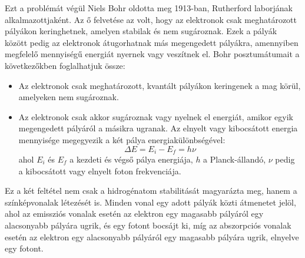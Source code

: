 \documentclass[../main.tex]{subfiles}
\begin{document}
Ezt a problémát végül Niels Bohr oldotta meg 1913-ban, Rutherford laborjának alkalmazottjaként. Az ő felvetése az volt, hogy az elektronok csak meghatározott pályákon keringhetnek,
amelyen stabilak és nem sugároznak. Ezek a pályák között pedig az elektronok átugorhatnak más megengedett pályákra, amennyiben megfelelő mennyiségű energiát nyernek vagy veszítnek el.
Bohr posztumátumait a következőkben foglalhatjuk össze:
\begin{itemize}
    \item Az elektronok csak meghatározott, kvantált pályákon keringenek a mag körül, amelyeken nem sugároznak.
    \item Az elektronok csak akkor sugároznak vagy nyelnek el energiát, amikor egyik megengedett pályáról a másikra ugranak. Az elnyelt vagy kibocsátott energia mennyisége megegyezik a két pálya energiakülönbségével:
    \begin{equation}
        \Delta E = E_i - E_f = h \nu
    \end{equation}
    ahol $E_i$ és $E_f$ a kezdeti és végső pálya energiája, $h$ a Planck-állandó, $\nu$ pedig a kibocsátott vagy elnyelt foton frekvenciája.
\end{itemize}
Ez a két feltétel nem csak a hidrogénatom stabilitását magyarázta meg, hanem a színképvonalak létezését is. Minden vonal egy adott pályák közti átmenetet jelöl, ahol az emissziós vonalak esetén az elektron egy magasabb pályáról egy alacsonyabb pályára ugrik,
és egy fotont bocsájt ki, míg az abszorpciós vonalak esetén az elektron egy alacsonyabb pályáról egy magasabb pályára ugrik, elnyelve egy fotont.
\end{document}
